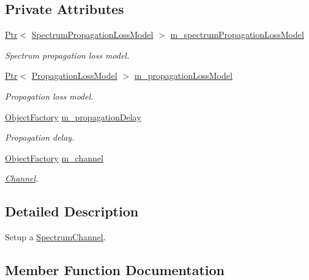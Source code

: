 \subsection*{Private Attributes}
\begin{DoxyCompactItemize}
\item 
\hyperlink{classns3_1_1Ptr}{Ptr}$<$ \hyperlink{classns3_1_1SpectrumPropagationLossModel}{Spectrum\+Propagation\+Loss\+Model} $>$ \hyperlink{classns3_1_1SpectrumChannelHelper_aebb1688f743b28b8dbfe8161de4ebc65}{m\+\_\+spectrum\+Propagation\+Loss\+Model}
\begin{DoxyCompactList}\small\item\em Spectrum propagation loss model. \end{DoxyCompactList}\item 
\hyperlink{classns3_1_1Ptr}{Ptr}$<$ \hyperlink{classns3_1_1PropagationLossModel}{Propagation\+Loss\+Model} $>$ \hyperlink{classns3_1_1SpectrumChannelHelper_af96b3585b23407abcaac9f62879563dc}{m\+\_\+propagation\+Loss\+Model}
\begin{DoxyCompactList}\small\item\em Propagation loss model. \end{DoxyCompactList}\item 
\hyperlink{classns3_1_1ObjectFactory}{Object\+Factory} \hyperlink{classns3_1_1SpectrumChannelHelper_a7d2912159b1e8e4e8fedc6e51878e821}{m\+\_\+propagation\+Delay}
\begin{DoxyCompactList}\small\item\em Propagation delay. \end{DoxyCompactList}\item 
\hyperlink{classns3_1_1ObjectFactory}{Object\+Factory} \hyperlink{classns3_1_1SpectrumChannelHelper_a95617ce557bc3f8dcfe4f50c4e10b27c}{m\+\_\+channel}
\begin{DoxyCompactList}\small\item\em \hyperlink{classns3_1_1Channel}{Channel}. \end{DoxyCompactList}\end{DoxyCompactItemize}


\subsection{Detailed Description}
Setup a \hyperlink{classns3_1_1SpectrumChannel}{Spectrum\+Channel}. 

\subsection{Member Function Documentation}
